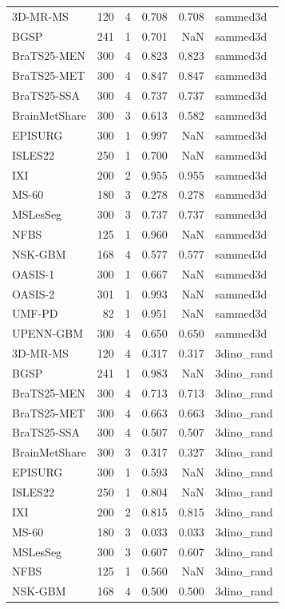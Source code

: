 \begin{tabular}{lrrrrl}
3D-MR-MS & 120 & 4 & 0.708 & 0.708 & sammed3d \\
BGSP & 241 & 1 & 0.701 & NaN & sammed3d \\
BraTS25-MEN & 300 & 4 & 0.823 & 0.823 & sammed3d \\
BraTS25-MET & 300 & 4 & 0.847 & 0.847 & sammed3d \\
BraTS25-SSA & 300 & 4 & 0.737 & 0.737 & sammed3d \\
BrainMetShare & 300 & 3 & 0.613 & 0.582 & sammed3d \\
EPISURG & 300 & 1 & 0.997 & NaN & sammed3d \\
ISLES22 & 250 & 1 & 0.700 & NaN & sammed3d \\
IXI & 200 & 2 & 0.955 & 0.955 & sammed3d \\
MS-60 & 180 & 3 & 0.278 & 0.278 & sammed3d \\
MSLesSeg & 300 & 3 & 0.737 & 0.737 & sammed3d \\
NFBS & 125 & 1 & 0.960 & NaN & sammed3d \\
NSK-GBM & 168 & 4 & 0.577 & 0.577 & sammed3d \\
OASIS-1 & 300 & 1 & 0.667 & NaN & sammed3d \\
OASIS-2 & 301 & 1 & 0.993 & NaN & sammed3d \\
UMF-PD & 82 & 1 & 0.951 & NaN & sammed3d \\
UPENN-GBM & 300 & 4 & 0.650 & 0.650 & sammed3d \\
3D-MR-MS & 120 & 4 & 0.317 & 0.317 & 3dino\_rand \\
BGSP & 241 & 1 & 0.983 & NaN & 3dino\_rand \\
BraTS25-MEN & 300 & 4 & 0.713 & 0.713 & 3dino\_rand \\
BraTS25-MET & 300 & 4 & 0.663 & 0.663 & 3dino\_rand \\
BraTS25-SSA & 300 & 4 & 0.507 & 0.507 & 3dino\_rand \\
BrainMetShare & 300 & 3 & 0.317 & 0.327 & 3dino\_rand \\
EPISURG & 300 & 1 & 0.593 & NaN & 3dino\_rand \\
ISLES22 & 250 & 1 & 0.804 & NaN & 3dino\_rand \\
IXI & 200 & 2 & 0.815 & 0.815 & 3dino\_rand \\
MS-60 & 180 & 3 & 0.033 & 0.033 & 3dino\_rand \\
MSLesSeg & 300 & 3 & 0.607 & 0.607 & 3dino\_rand \\
NFBS & 125 & 1 & 0.560 & NaN & 3dino\_rand \\
NSK-GBM & 168 & 4 & 0.500 & 0.500 & 3dino\_rand \\

\end{tabular}

